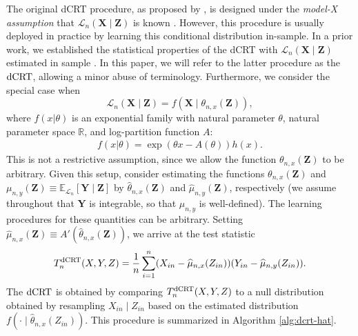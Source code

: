 \documentclass[12pt]{article}
\theoremstyle{definition}
\newcommand{\E}{\mathbb E}								%
\newcommand{\R}{\mathbb{R}}								%
\newcommand{\prx}{\bm X}								%
\newcommand{\srx}{X}									%
\newcommand{\prz}{\bm Z}								%
\newcommand{\srz}{Z}									%
\newcommand{\pry}{{\bm Y}}								%
\newcommand{\sry}{Y}									%
\newcommand{\law}{\mathcal L}							%
\newcommand{\dCRT}{\textnormal{dCRT}} 					%
\begin{document}
The original dCRT procedure, as proposed by \citet{Liu2022a}, is designed under the \textit{model-X assumption} that $\law_n(\prx \mid \prz)$ is known \citep{CetL16}. However, this procedure is usually deployed in practice by learning this conditional distribution in-sample. In a prior work, we established the statistical properties of the dCRT with $\law_n(\prx \mid \prz)$ estimated in sample \citep{Niu2022a}. In this paper, we will refer to the latter procedure as the $\dCRT$, allowing a minor abuse of terminology. Furthermore, we consider the special case when 
\begin{equation}
\law_n(\prx \mid \prz) = f(\prx \mid \theta_{n,x}(\prz)), 
\end{equation}
where $f(x|\theta)$ is an exponential family with natural parameter $\theta$, natural parameter space $\R$, and log-partition function $A$:
\begin{align*}
f(x|\theta)=\exp(\theta x -A(\theta))h(x).
\end{align*}
This is not a restrictive assumption, since we allow the function $\theta_{n,x}(\prz)$ to be arbitrary. Given this setup, consider estimating the functions $\theta_{n,x}(\prz)$ and $\mu_{n,y}(\prz) \equiv \E_{\law_n}[\pry \mid \prz]$ by $\widehat{\theta}_{n,x}(\prz)$ and $\widehat \mu_{n,y}(\prz)$, respectively (we assume throughout that $\pry$ is integrable, so that $\mu_{n,y}$ is well-defined). The learning procedures for these quantities can be arbitrary. Setting $\widehat \mu_{n,x}(\prz) \equiv A'(\widehat{\theta}_{n,x}(\prz))$, we arrive at the test statistic 
\begin{align}\label{eq:dCRThat}
	T_n^{\dCRT}(X,Y,Z)
  =\frac{1}{n}\sum_{i=1}^{n}(\srx_{in}-\widehat\mu_{n,x}(\srz_{in}))(\sry_{in}-\widehat{\mu}_{n,y}(\srz_{in})).
\end{align}
The $\dCRT$ is obtained by comparing $T_n^{\dCRT}(\srx, \sry, \srz)$ to a null distribution obtained by resampling $\srx_{in} \mid \srz_{in}$ based on the estimated distribution $f(\cdot \mid \widehat \theta_{n,x}(Z_{in})).$ This procedure is summarized in Algorithm \ref{alg:dcrt-hat}. 
\end{document}
